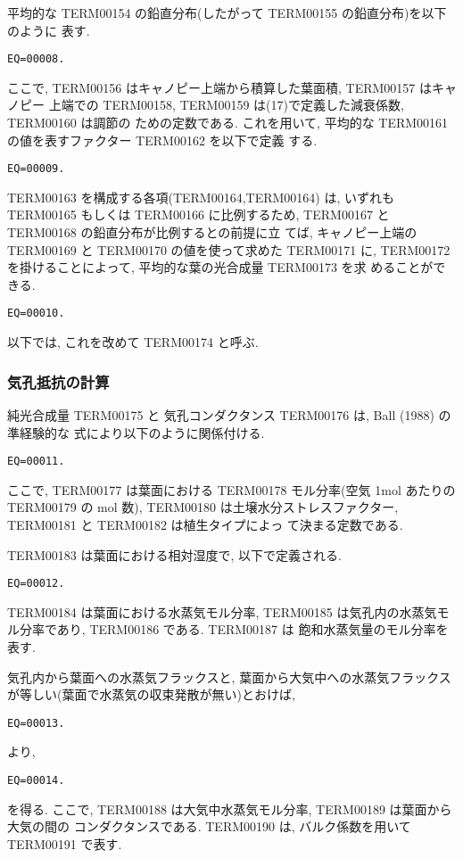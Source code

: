 平均的な TERM00154 の鉛直分布(したがって TERM00155 の鉛直分布)を以下のように
表す.
\begin{verbatim}
EQ=00008.
\end{verbatim}
ここで, TERM00156 はキャノピー上端から積算した葉面積, TERM00157 はキャノピー
上端での TERM00158, TERM00159 は(17)で定義した減衰係数, TERM00160 は調節の
ための定数である.
これを用いて, 平均的な TERM00161 の値を表すファクター TERM00162 を以下で定義
する.
\begin{verbatim}
EQ=00009.
\end{verbatim}
TERM00163 を構成する各項(TERM00164,TERM00164) は, いずれも TERM00165 もしくは
TERM00166 に比例するため, TERM00167 と TERM00168 の鉛直分布が比例するとの前提に立
てば, キャノピー上端の TERM00169 と TERM00170 の値を使って求めた TERM00171 に,
TERM00172 を掛けることによって, 平均的な葉の光合成量 TERM00173 を求
めることができる.
\begin{verbatim}
EQ=00010.
\end{verbatim}
以下では, これを改めて TERM00174 と呼ぶ.

\subsubsection{気孔抵抗の計算}

純光合成量 TERM00175 と 気孔コンダクタンス TERM00176 は, Ball (1988) の準経験的な
式により以下のように関係付ける.
\begin{verbatim}
EQ=00011.
\end{verbatim}
ここで, TERM00177 は葉面における TERM00178 モル分率(空気 1mol あたりの TERM00179 の
mol 数), TERM00180 は土壌水分ストレスファクター, TERM00181 と TERM00182 は植生タイプによっ
て決まる定数である.

TERM00183 は葉面における相対湿度で, 以下で定義される.
\begin{verbatim}
EQ=00012.
\end{verbatim}
TERM00184 は葉面における水蒸気モル分率,
TERM00185 は気孔内の水蒸気モル分率であり, TERM00186 である. TERM00187 は
飽和水蒸気量のモル分率を表す.

気孔内から葉面への水蒸気フラックスと, 葉面から大気中への水蒸気フラックス
が等しい(葉面で水蒸気の収束発散が無い)とおけば,
\begin{verbatim}
EQ=00013.
\end{verbatim}
より,
\begin{verbatim}
EQ=00014.
\end{verbatim}
を得る. ここで, TERM00188 は大気中水蒸気モル分率, TERM00189 は葉面から大気の間の
コンダクタンスである. TERM00190 は, バルク係数を用いて TERM00191 で表す.

